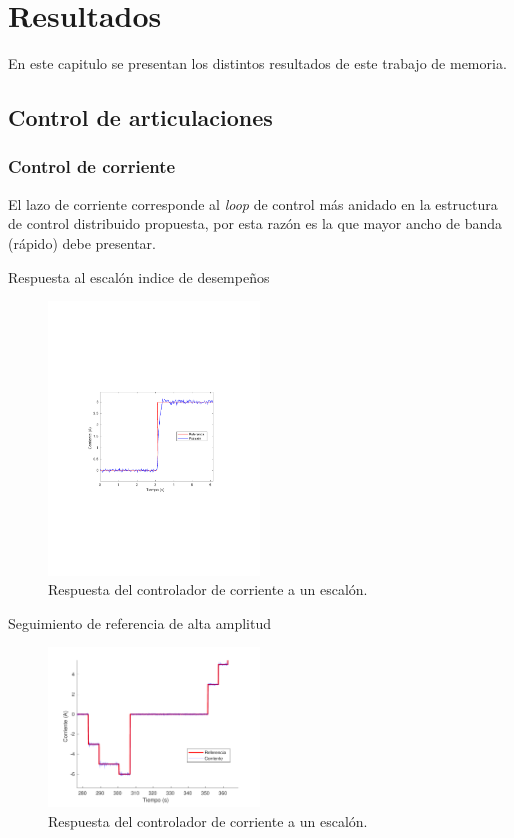 \chapter{Resultados}

En este capitulo se presentan los distintos resultados de este trabajo de memoria.

\section{Control de articulaciones}

\subsection{Control de corriente}

El lazo de corriente corresponde al \textit{loop} de control más anidado en la estructura de control distribuido propuesta, por esta razón es la que mayor ancho de banda (rápido) debe presentar.

Respuesta al escalón
indice de desempeños

\begin{figure}[H]
  \centering
  \includegraphics[width=0.5\textwidth]{img/cap5/step_corriente.pdf}
  \caption{Respuesta del controlador de corriente a un escalón.}
  \label{cap5_step_corriente}
\end{figure}

Seguimiento de referencia de alta amplitud

\begin{figure}[H]
  \centering
  \includegraphics[width=0.5\textwidth]{img/cap5/corriente_cambio_referencia_alto.pdf}
  \caption{Respuesta del controlador de corriente a un escalón.}
  \label{cap5_corriente_cambio_referencia_alto}
\end{figure}


